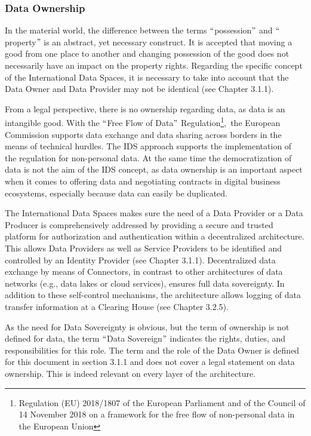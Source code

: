 \subsubsection{Data Ownership}
In the material world, the difference between the terms $``$possession$"$  and $``$property$"$  is an abstract, yet necessary construct. It is accepted that moving a good from one place to another and changing possession of the good does not necessarily have an impact on the property rights. Regarding the specific concept of the International Data Spaces, it is necessary to take into account that the Data Owner and Data Provider may not be identical (see Chapter 3.1.1).

From a legal perspective, there is no ownership regarding data, as data is an intangible good. With the $``$Free Flow of Data$"$  Regulation\footnote{ Regulation (EU) 2018/1807 of the European Parliament and of the Council of 14 November 2018 on a framework for the free flow of non-personal data in the European Union },\ the European Commission supports data exchange and data sharing across borders in the means of technical hurdles. The IDS approach supports the implementation of the regulation for non-personal data. At the same time the democratization of data is not the aim of the IDS concept, as  data ownership is an important aspect when it comes to offering data and negotiating contracts in digital business ecosystems, especially because data can easily be duplicated. 

The International Data Spaces makes sure the need of a Data Provider or a Data Producer is comprehensively addressed by providing a secure and trusted platform for authorization and authentication within a decentralized architecture. This allows Data Providers as well as Service Providers to be identified and controlled by an Identity Provider (see Chapter 3.1.1). Decentralized data exchange by means of Connectors, in contrast to other architectures of data networks (e.g., data lakes or cloud services), ensures full data sovereignty. In addition to these self-control mechanisms, the architecture allows logging of data transfer information at a Clearing House (see Chapter 3.2.5). 

As the need for Data Sovereignty is obvious, but the term of ownership is not defined for data, the term $``$Data Sovereign$"$  indicates the rights, duties, and responsibilities for this role. The term and the role of the Data Owner is defined for this document in section 3.1.1 and does not cover a legal statement on data ownership. This is indeed relevant on every layer of the architecture. 

